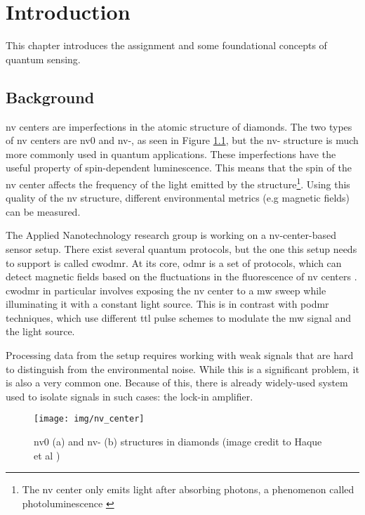 \chapter{Introduction}
This chapter introduces the assignment and some foundational concepts of quantum sensing.

\section{Background}\label{chap:background}
\gls{nv} centers \cite{enwiki:1301369588} are imperfections in the atomic structure of diamonds. The two types of \gls{nv} centers are \gls{nv}0 and \gls{nv}-, as seen in Figure \ref{fig:nvcenter}, but the \gls{nv}- structure is much more commonly used in quantum applications. These imperfections have the useful property of spin-dependent luminescence. This means that the spin of the \gls{nv} center affects the frequency of the light emitted by the structure\footnote{The \gls{nv} center only emits light after absorbing photons, a phenomenon called photoluminescence \cite{enwiki:1309081879}}. Using this quality of the \gls{nv} structure, different environmental metrics (e.g magnetic fields) can be measured. 

The Applied Nanotechnology research group is working on a \gls{nv}-center-based sensor setup. There exist several quantum protocols, but the one this setup needs to support is called \gls{cwodmr}. At its core, \gls{odmr} is a set of protocols, which can detect magnetic fields based on the fluctuations in the fluorescence of \gls{nv} centers \cite{enwiki:1301371272}. \gls{cwodmr} in particular involves exposing the \gls{nv} center to a \gls{mw} sweep while illuminating it with a constant light source. This is in contrast with \gls{podmr} techniques, which use different \gls{ttl} pulse schemes \cite{sewani2020coherent} to modulate the \gls{mw} signal and the light source.

Processing data from the setup requires working with weak signals that are hard to distinguish from the environmental noise. While this is a significant problem, it is also a very common one. Because of this, there is already widely-used system used to isolate signals in such cases: the lock-in amplifier.

\begin{figure}[ht]
	\centering
	\texttt{[image: img/nv\_center]}
	\caption{\gls{nv}0 (a) and \gls{nv}- (b) structures in diamonds (image credit to Haque et al \cite{haque2017overview})}
	\label{fig:nvcenter}
\end{figure}


